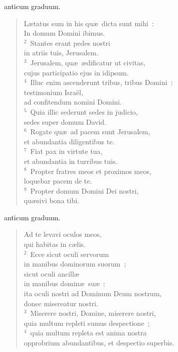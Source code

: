 \bchapter
{}anticum graduum. \begin{flushleft}\begin{verse}\vspace{6pt}L\ae tatus sum in his qu\ae\ dicta sunt mihi~:\\ In domum Domini ibimus.\\
${}^{2}$~Stantes erant pedes nostri\\ in atriis tuis, Jerusalem.\\
${}^{3}$~Jerusalem, qu\ae\ \ae dificatur ut civitas,\\ cujus participatio ejus in idipsum.\\
${}^{4}$~Illuc enim ascenderunt tribus, tribus Domini~:\\ testimonium Isra\"el,\\ ad confitendum nomini Domini.\\
${}^{5}$~Quia illic sederunt sedes in judicio,\\ sedes super domum David.\\
${}^{6}$~Rogate qu\ae\ ad pacem sunt Jerusalem,\\ et abundantia diligentibus te.\\
${}^{7}$~Fiat pax in virtute tua,\\ et abundantia in turribus tuis.\\
${}^{8}$~Propter fratres meos et proximos meos,\\ loquebar pacem de te.\\
${}^{9}$~Propter domum Domini Dei nostri,\\ qu\ae sivi bona tibi.\end{verse}\end{flushleft}



\bchapter
{}anticum graduum. \begin{flushleft}\begin{verse}\vspace{6pt}Ad te levavi oculos meos,\\ qui habitas in c\ae lis.\\
${}^{2}$~Ecce sicut oculi servorum\\ in manibus dominorum suorum~;\\ sicut oculi ancill\ae \\ in manibus domin\ae\ su\ae~:\\ ita oculi nostri ad Dominum Deum nostrum,\\ donec misereatur nostri.\\
${}^{3}$~Miserere nostri, Domine, miserere nostri,\\ quia multum repleti sumus despectione~;\\
${}^{4}$~quia multum repleta est anima nostra\\ opprobrium abundantibus, et despectio superbis.\end{verse}\end{flushleft}



